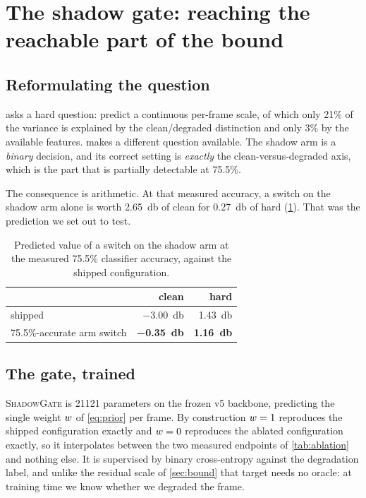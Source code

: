 \section{The shadow gate: reaching the reachable part of the bound}
\label{sec:gate}

\subsection{Reformulating the question}
\label{sec:reformulation}

 asks a hard question: predict a continuous per-frame scale, of
which only 21\% of the variance is explained by the clean/degraded distinction
and only 3\% by the available features.  makes a different
question available. The shadow arm is a \emph{binary} decision, and its correct
setting is \emph{exactly} the clean-versus-degraded axis, which is the part that
is partially detectable at 75.5\%.

The consequence is arithmetic. At that measured accuracy, a switch on the shadow
arm alone is worth \SI{+2.65}{\decibel} of clean for \SI{0.27}{\decibel} of hard
(\cref{tab:prediction}). That was the prediction we set out to test.

\begin{table}[htbp]
\centering
\caption{Predicted value of a switch on the shadow arm at the measured 75.5\%
classifier accuracy, against the shipped configuration.}
\label{tab:prediction}
\begin{tabular}{lrr}
\toprule
 & clean & hard \\
\midrule
shipped                      & \SI{-3.00}{\decibel} & \SI{+1.43}{\decibel} \\
75.5\%-accurate arm switch   & \textbf{\SI{-0.35}{\decibel}} & \textbf{\SI{+1.16}{\decibel}} \\
\bottomrule
\end{tabular}
\end{table}

\subsection{The gate, trained}
\label{sec:gate-trained}

\textsc{ShadowGate} is \num{21121} parameters on the frozen v5 backbone,
predicting the single weight $w$ of \cref{eq:prior} per frame. By construction
$w = 1$ reproduces the shipped configuration exactly and $w = 0$ reproduces
the ablated configuration exactly, so it interpolates between the two measured
endpoints of \cref{tab:ablation} and nothing else. It is supervised by binary
cross-entropy against the degradation label, and unlike the residual scale of
\cref{sec:bound} that target needs no oracle: at training time we know whether
we degraded the frame.

